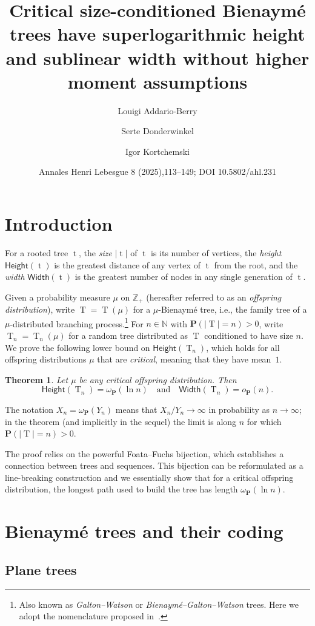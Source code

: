 \documentclass[10pt]{amsart}
\title[Critical conditioned trees: height and width]{Critical size-conditioned Bienaym\'e trees have superlogarithmic height and sublinear width without higher moment assumptions}
\author{Louigi Addario-Berry}
\author{Serte Donderwinkel}
\author{Igor Kortchemski}
\date{Annales Henri Lebesgue 8 (2025),113–149; DOI 10.5802/ahl.231}
\newtheorem{theo}{Theorem}[section]
\theoremstyle{definition}
\numberwithin{figure}{section}
\newcommand{\Z}{\mathbb{Z}}
\newcommand{\N}{\mathbb{N}}
\renewcommand{\H}{\mathsf{Height}}
\newcommand{\p}{\mathbf{P}}
\newcommand{\Width}{\mathsf{Width}}
\DeclareMathOperator{\tree}{t}
\DeclareMathOperator{\rtree}{T}
\begin{document}
\maketitle
\section{Introduction}

For a rooted tree $\tree$, the \emph{size} $|\tree|$ of $\tree$ is its number of vertices, the \emph{height} $\H(\tree)$ is the greatest distance of any vertex of $\tree$ from the root, and the \emph{width} $\Width(\tree)$ is the greatest number of nodes in any single generation of $\tree$.

Given a probability measure $\mu$ on $\Z_{+}$ (hereafter referred to as an \emph{offspring distribution}), write $\rtree=\rtree(\mu)$ for a $\mu$-Bienaymé tree, i.e., the family tree of a $\mu$-distributed branching process.\footnote{Also known as \emph{Galton--Watson} or \emph{Bienaymé--Galton--Watson} trees. Here we adopt the nomenclature proposed in~\cite{ABHK21}.} For $n \in \N$ with $\p(|\rtree|=n)>0$, write $\rtree_n=\rtree_n(\mu)$ for a random tree distributed as $\rtree$ conditioned to have size $n$. We prove the following lower bound on $\H(\rtree_n)$, which holds for all offspring distributions $\mu$ that are \emph{critical}, meaning that they have mean~$1$.
\begin{theo}\label{thm:height_critical0}
Let $\mu$ be any critical offspring distribution. Then
\[
\H(\rtree_{n}) = \omega_{\p}(\ln n)
\quad \text{and} \quad
\Width(\rtree_n)=o_{\p}(n).
\]
\end{theo}
The notation $X_n = \omega_{\p}(Y_n)$ means that $X_n/Y_n \to \infty$ in probability as $n \to \infty$; in the theorem (and implicitly in the sequel) the limit is along $n$ for which $\p(|\rtree|=n)>0$.

The proof relies on the powerful Foata--Fuchs bijection, which establishes a connection between trees and sequences. This bijection can be reformulated as a line-breaking construction and we essentially show that for a critical offspring distribution, the longest path used to build the tree has length $\omega_{\p}(\ln n)$.
\section{Bienaymé trees and their coding}\label{sec:trees}

\subsection{Plane trees}\label{sssec:planetrees}
\end{document}
